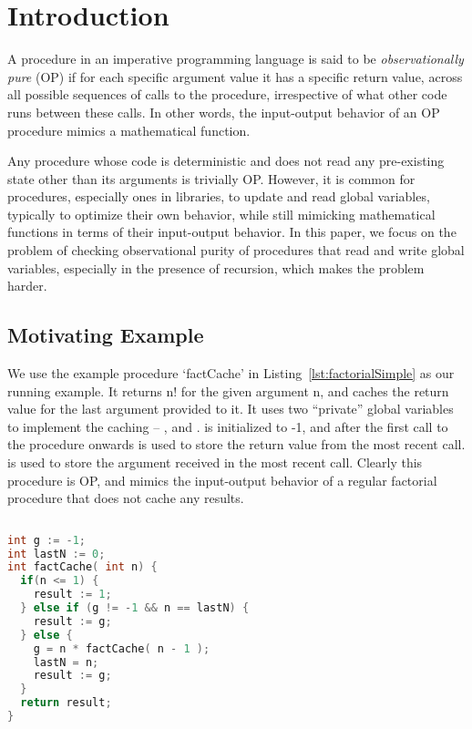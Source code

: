 \section{Introduction}

A procedure in an imperative programming language is said to be
\emph{observationally pure} (OP) if for each specific argument value it has
a specific return value, across all possible sequences of calls to the
procedure, irrespective of what other code runs between these calls.  In
other words, the input-output behavior of an OP procedure mimics a mathematical
function.




Any procedure whose code is deterministic and does not read any
pre-existing state other than its arguments is trivially OP.
However, it is common for procedures, especially ones in libraries,
to update and read global variables, typically to optimize their own behavior,
while still mimicking mathematical functions in terms of their input-output behavior.
In this paper, we focus on the problem of checking observational purity of
procedures that read and write global variables, especially in the presence of recursion,
which makes the problem harder.

\subsection{Motivating Example}
We use the example procedure `factCache' in
Listing~\ref{lst:factorialSimple}  as our running example. It
returns n! for the given argument n, and caches the return value for the
last argument provided to it. It uses two ``private'' global variables to
implement the caching -- , and .  is initialized to -1, and after
the first call to the procedure onwards is used to store the return value
from the most recent call.  is used to store the argument received in
the most recent call. Clearly this procedure is OP, and mimics the
input-output behavior of a regular factorial procedure that does not cache
any results. 

\begin{lstlisting}[float,language=c,basicstyle=\scriptsize,caption= {Procedure factCache:
      returns n!, and memoizes most recent result.},
    label=lst:factorialSimple]
  
int g := -1;
int lastN := 0;
int factCache( int n) {
  if(n <= 1) {
    result := 1;
  } else if (g != -1 && n == lastN) {
    result := g;
  } else {
    g = n * factCache( n - 1 );
    lastN = n;
    result := g;
  }
  return result;
}
\end{lstlisting}

